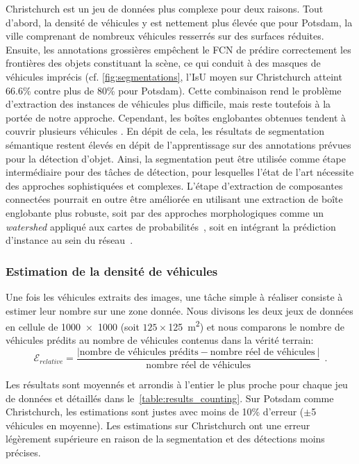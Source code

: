 Christchurch est un jeu de données plus complexe pour deux raisons. Tout d'abord, la densité de véhicules y est nettement plus élevée que pour Potsdam, la ville comprenant de nombreux véhicules resserrés sur des surfaces réduites. Ensuite, les annotations grossières empêchent le \gls{FCN} de prédire correctement les frontières des objets constituant la scène, ce qui conduit à des masques de véhicules imprécis (cf. \cref{fig:segmentations}, l'\gls{IsU} moyen sur Christchurch atteint \num{66.6}\% contre plus de 80\% pour Potsdam). Cette combinaison rend le problème d'extraction des instances de véhicules plus difficile, mais reste toutefois à la portée de notre approche. Cependant, les boîtes englobantes obtenues tendent à couvrir plusieurs véhicules .
En dépit de cela, les résultats de segmentation sémantique restent élevés en dépit de l'apprentissage sur des annotations prévues pour la détection d'objet. Ainsi, la segmentation peut être utilisée comme étape intermédiaire pour des tâches de détection, pour lesquelles l'état de l'art nécessite des approches sophistiquées et complexes. L'étape d'extraction de composantes connectées pourrait en outre être améliorée en utilisant une extraction de boîte englobante plus robuste, soit par des approches morphologiques comme un \emph{watershed} appliqué aux cartes de probabilités~\cite{beucher_morphological_1993,bai_deep_2017}, soit en intégrant la prédiction d'instance au sein du réseau~\cite{dai_instance-aware_2016,he_mask_2017}.

\subsubsection{Estimation de la densité de véhicules}

Une fois les véhicules extraits des images, une tâche simple à réaliser consiste à estimer leur nombre sur une zone donnée. Nous divisons les deux jeux de données en cellule de \num{1000x1000}\SI{}{\px} (soit $125\times$\SI{125}{\meter\squared}) et nous comparons le nombre de véhicules prédits au nombre de véhicules contenus dans la vérité terrain:
\begin{equation}
\mathcal{E}_\mathit{relative} = \frac{|\text{nombre de véhicules prédits} - \text{nombre réel de véhicules}~|}{\text{nombre réel de véhicules}}~~.
\end{equation}

Les résultats sont moyennés et arrondis à l'entier le plus proche pour chaque jeu de données et détaillés dans le~\cref{table:results_counting}. Sur Potsdam comme Christchurch, les estimations sont justes avec moins de 10\% d'erreur ($\pm$5 véhicules en moyenne). Les estimations sur Christchurch ont une erreur légèrement supérieure en raison de la segmentation et des détections moins précises.

